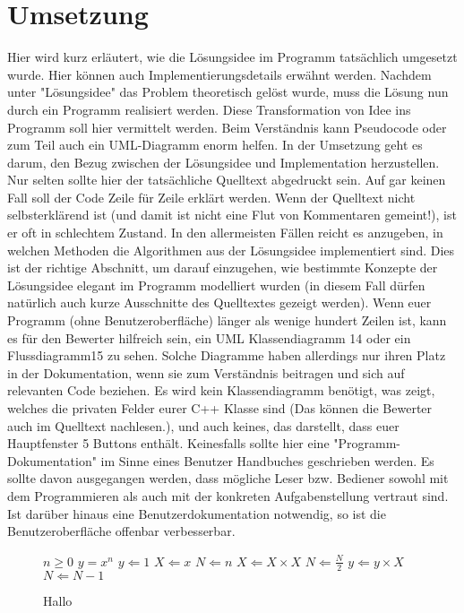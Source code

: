 \documentclass[a4paper,10pt,ngerman]{scrartcl}
\begin{document}
    \section{Umsetzung}\label{sec:umsetzung}
    Hier wird kurz erläutert, wie die Lösungsidee im Programm tatsächlich umgesetzt wurde.
    Hier können auch Implementierungsdetails erwähnt werden.
    Nachdem unter "Lösungsidee" das Problem theoretisch gelöst wurde, muss die Lösung nun durch ein Programm realisiert werden.
    Diese Transformation von Idee ins Programm soll hier vermittelt werden.
    Beim Verständnis kann Pseudocode oder zum Teil auch ein UML-Diagramm enorm helfen.
    In der Umsetzung geht es darum, den Bezug zwischen der Lösungsidee und
    Implementation herzustellen.
    Nur selten sollte hier der tatsächliche Quelltext abgedruckt sein.
    Auf gar keinen Fall soll der Code Zeile für Zeile erklärt werden.
    Wenn der Quelltext nicht selbsterklärend ist (und damit ist nicht eine Flut von Kommentaren gemeint!), ist er
    oft in schlechtem Zustand.
    In den allermeisten Fällen reicht es anzugeben, in welchen
    Methoden die Algorithmen aus der Lösungsidee implementiert sind.
    Dies ist der richtige Abschnitt, um darauf einzugehen, wie bestimmte Konzepte der
    Lösungsidee elegant im Programm modelliert wurden (in diesem Fall dürfen natürlich
    auch kurze Ausschnitte des Quelltextes gezeigt werden).
    Wenn euer Programm (ohne Benutzeroberfläche) länger als wenige hundert Zeilen ist,
    kann es für den Bewerter hilfreich sein, ein UML Klassendiagramm
    14 oder ein Flussdiagramm15 zu sehen.
    Solche Diagramme haben allerdings nur ihren Platz in der Dokumentation, wenn sie zum Verständnis beitragen und sich auf relevanten Code beziehen. Es
    wird kein Klassendiagramm benötigt, was zeigt, welches die privaten Felder eurer C++
    Klasse sind (Das können die Bewerter auch im Quelltext nachlesen.), und auch keines,
    das darstellt, dass euer Hauptfenster 5 Buttons enthält.
    Keinesfalls sollte hier eine "Programm-Dokumentation" im Sinne eines Benutzer Handbuches geschrieben werden.
    Es sollte davon ausgegangen werden, dass mögliche
    Leser bzw.
    Bediener sowohl mit dem Programmieren als auch mit der konkreten Aufgabenstellung vertraut sind.
    Ist darüber hinaus eine Benutzerdokumentation notwendig,
    so ist die Benutzeroberfläche offenbar verbesserbar.
    
    \begin{figure}\label{fig:pseudocode}
    \begin{algorithmic}
	\Require $n \geq 0$
	\Ensure $y = x^n$
	\State $y \Leftarrow 1$
	\State $X \Leftarrow x$
	\State $N \Leftarrow n$
 	 \State $X \Leftarrow X \times X$
 	 \State $N \Leftarrow \frac{N}{2} $  
 	 \State $y \Leftarrow y \times X$
 	 \State $N \Leftarrow N - 1$
	\EndIf
	\EndWhile
	\end{algorithmic}
	\caption{Hallo}
    \end{figure}
\end{document}
